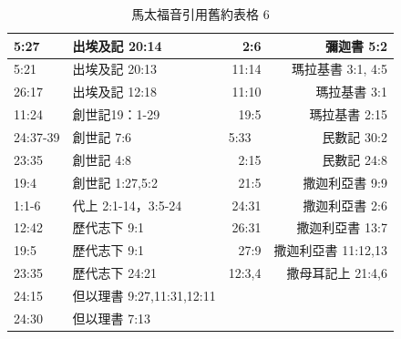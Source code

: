 \begin{table}[htbp]
\begin{tabular}{|p{6.93em}|p{13.93em}|r|r|}
    \midrule
    5:27  & 出埃及記 20:14 & \multicolumn{1}{p{6.715em}|}{2:6} & \multicolumn{1}{p{12.645em}|}{彌迦書 5:2} \\
    \midrule
    5:21  & 出埃及記 20:13 & \multicolumn{1}{p{6.715em}|}{11:14} & \multicolumn{1}{p{12.645em}|}{瑪拉基書 3:1, 4:5} \\
    \midrule
    26:17 & 出埃及記 12:18 & \multicolumn{1}{p{6.715em}|}{11:10} & \multicolumn{1}{p{12.645em}|}{瑪拉基書 3:1} \\
    \midrule
    11:24 & 創世記19：1-29 & \multicolumn{1}{p{6.715em}|}{19:5} & \multicolumn{1}{p{12.645em}|}{瑪拉基書 2:15} \\
    \midrule
    24:37-39 & 創世記 7:6 & \multicolumn{1}{l|}{5:33} & \multicolumn{1}{p{12.645em}|}{民數記 30:2} \\
    \midrule
    23:35 & 創世記 4:8 & \multicolumn{1}{p{6.715em}|}{2:15} & \multicolumn{1}{p{12.645em}|}{民數記 24:8} \\
    \midrule
    19:4  & 創世記 1:27,5:2 & \multicolumn{1}{p{6.715em}|}{21:5} & \multicolumn{1}{p{12.645em}|}{撒迦利亞書 9:9} \\
    \midrule
    1:1-6 & 代上 2:1-14，3:5-24 & \multicolumn{1}{p{6.715em}|}{24:31} & \multicolumn{1}{p{12.645em}|}{撒迦利亞書 2:6} \\
    \midrule
    12:42 & 歷代志下 9:1 & \multicolumn{1}{p{6.715em}|}{26:31} & \multicolumn{1}{p{12.645em}|}{撒迦利亞書 13:7} \\
    \midrule
    19:5  & 歷代志下 9:1 & \multicolumn{1}{p{6.715em}|}{27:9} & \multicolumn{1}{p{12.645em}|}{撒迦利亞書 11:12,13} \\
    \midrule
    23:35 & 歷代志下 24:21 & \multicolumn{1}{p{6.715em}|}{12:3,4} & \multicolumn{1}{p{12.645em}|}{撒母耳記上 21:4,6} \\
    \midrule
    24:15 & 但以理書 9:27,11:31,12:11 &       &  \\
    \midrule
    24:30 & 但以理書 7:13 &       &  \\
    \bottomrule
    \end{tabular}%
  \label{tab:addlabel}%
   \caption{馬太福音引用舊約表格 6} 
\end{table}%

